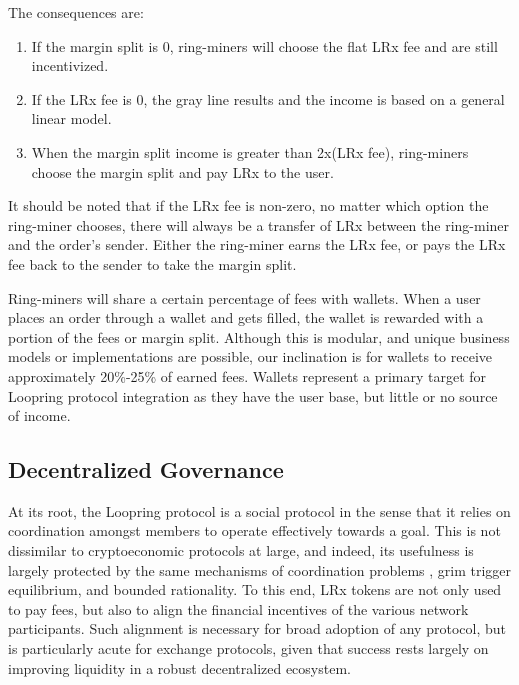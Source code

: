 \documentclass[UTF8,nofonts]{article}
\begin{document}
\begin{multicols}{2}
The consequences are:  
\begin{enumerate}
	\item If the margin split is 0, ring-miners will choose the flat LRx fee and are still incentivized. 
	\item If the LRx fee is 0, the gray line results and the income is based on a general linear model.
	\item When the margin split income is greater than 2x(LRx fee), ring-miners choose the margin split and pay LRx to the user.
\end{enumerate}

It should be noted that if the LRx fee is non-zero, no matter which option the ring-miner chooses, there will always be a transfer of LRx between the ring-miner and the order's sender. Either the ring-miner earns the LRx fee, or pays the LRx fee back to the sender to take the margin split.

Ring-miners will share a certain percentage of fees with wallets. When a user places an order through a wallet and gets filled, the wallet is rewarded with a portion of the fees or margin split. Although this is modular, and unique business models or implementations are possible, our inclination is for wallets to receive approximately 20\%-25\% of earned fees. Wallets represent a primary target for Loopring protocol integration as they have the user base, but little or no source of income.

\subsection{Decentralized Governance}
At its root, the Loopring protocol is a social protocol in the sense that it relies on coordination amongst members to operate effectively towards a goal. This is not dissimilar to cryptoeconomic protocols at large, and indeed, its usefulness is largely protected by the same mechanisms of coordination problems \cite{vitalikgovernance}, grim trigger equilibrium, and bounded rationality. To this end, LRx tokens are not only used to pay fees, but also to align the financial incentives of the various network participants. Such alignment is necessary for broad adoption of any protocol, but is particularly acute for exchange protocols, given that success rests largely on improving liquidity in a robust decentralized ecosystem.


\end{multicols}
\end{document}
